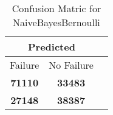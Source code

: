 \begin{table}[] 
\caption{Confusion Matric for NaiveBayesBernoulli} 
\label{Table: Prediction Accuracy-DMDNaiveBayesBernoulliOnlySunEKF-ignoreReflection100.9EKF-top2-Reflection} 
\centering 
\begin{tabular} 
 {@{}ccc@{}} 
\toprule 
\multicolumn{2}{c}{\textbf{Predicted}}
 \\ \midrule 
\multicolumn{1}{|c|}{Failure} & 
\multicolumn{1}{c|}{No Failure}
 \\ \midrule 
\multicolumn{1}{|c|}{\color{green}\textbf{71110}} & 
\multicolumn{1}{c|}{\color{red}\textbf{33483}}
 \\ \midrule 
\multicolumn{1}{|c|}{\color{red}\textbf{27148}} & 
\multicolumn{1}{c|}{\color{green}\textbf{38387}}
 \\ \bottomrule 
\end{tabular} 
\end{table} 
